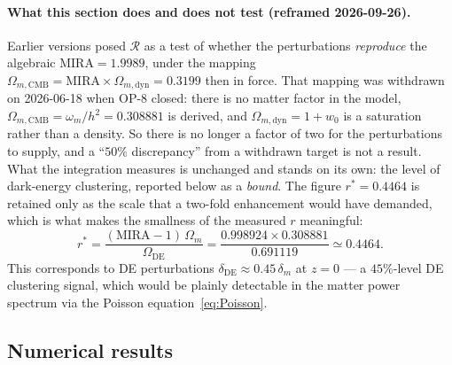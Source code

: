 \documentclass[12pt,a4paper]{article}
\begin{document}
\paragraph{What this section does and does not test (reframed 2026-09-26).}
Earlier versions posed $\mathcal{R}$ as a test of whether the perturbations
\emph{reproduce} the algebraic $\mathrm{MIRA}=1.9989$, under the mapping
$\Omega_{m,\mathrm{CMB}} = \mathrm{MIRA}\times\Omega_{m,\mathrm{dyn}} = 0.3199$ then in force.
That mapping was withdrawn on 2026-06-18 when OP-8 closed: there is no matter
factor in the model, $\Omega_{m,\mathrm{CMB}}=\omega_m/h^{2}=0.308881$ is derived, and
$\Omega_{m,\mathrm{dyn}}=1+w_0$ is a saturation rather than a density. So there is no
longer a factor of two for the perturbations to supply, and a
``$50\%$ discrepancy'' from a withdrawn target is not a result.
What the integration measures is unchanged and stands on its own: the level of
dark-energy clustering, reported below as a \emph{bound}. The figure
$r^*=0.4464$ is retained only as the scale that a two-fold enhancement would
have demanded, which is what makes the smallness of the measured $r$ meaningful:
\begin{equation}
  r^* = \frac{(\mathrm{MIRA}-1)\,\Omega_m}{\Omega_{\mathrm{DE}}}
  = \frac{0.998924 \times 0.308881}{0.691119}
  \simeq 0.4464.
  \label{eq:r_required}
\end{equation}
This corresponds to DE perturbations $\delta_{\mathrm{DE}} \approx 0.45\,\delta_m$
at $z=0$ — a $45\%$-level DE clustering signal, which would be plainly
detectable in the matter power spectrum via the Poisson
equation~\eqref{eq:Poisson}.

\subsection{Numerical results}
\label{subsec:results_MIRA}
\end{document}
